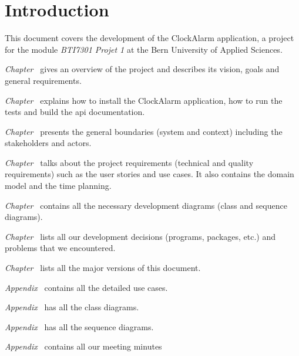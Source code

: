 \chapter{Introduction}

This document covers the development of the ClockAlarm application, a project
for the module \textit{BTI7301 Projet 1} at the Bern University of Applied
Sciences.

\textit{Chapter~} gives an overview of the
project and describes its vision, goals and general requirements.

\textit{Chapter~} explains how to install the
ClockAlarm application, how to run the tests and build the api documentation.

\textit{Chapter~} presents the general boundaries
(system and context) including the stakeholders and actors.

\textit{Chapter~} talks about the project requirements
(technical and quality requirements) such as the user stories and use cases. It
also contains the domain model and the time planning.

\textit{Chapter~} contains all the necessary development
diagrams (class and sequence diagrams).

\textit{Chapter~} lists all our development decisions
(programs, packages, etc.) and problems that we encountered.

\textit{Chapter~} lists all the major versions of this
document.

\textit{Appendix~} contains all the detailed use
cases.

\textit{Appendix~} has all the class diagrams.

\textit{Appendix~} has all the sequence diagrams.

\textit{Appendix~} contains all our meeting minutes
